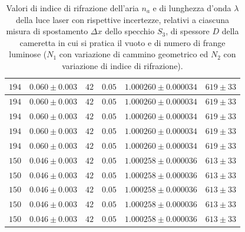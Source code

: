 \documentclass[]{article}
\begin{document}
\begin{table}[H]
\begin{tabular}{||c|c||c|c||c|c||}
        \hline
        $194$ & $0.060 \pm 0.003$ & $42$ & $0.05$ & $1.000260 \pm 0.000034$ & $619 \pm 33$ \\\hline
        $194$ & $0.060 \pm 0.003$ & $42$ & $0.05$ & $1.000260 \pm 0.000034$ & $619 \pm 33$ \\\hline
        $194$ & $0.060 \pm 0.003$ & $42$ & $0.05$ & $1.000260 \pm 0.000034$ & $619 \pm 33$ \\\hline
        $194$ & $0.060 \pm 0.003$ & $42$ & $0.05$ & $1.000260 \pm 0.000034$ & $619 \pm 33$ \\\hline
        $194$ & $0.060 \pm 0.003$ & $42$ & $0.05$ & $1.000260 \pm 0.000034$ & $619 \pm 33$ \\\hline
        \hline
        $150$ & $0.046 \pm 0.003$ & $42$ & $0.05$ & $1.000258 \pm 0.000036$ & $613 \pm 33$ \\\hline
        $150$ & $0.046 \pm 0.003$ & $42$ & $0.05$ & $1.000258 \pm 0.000036$ & $613 \pm 33$ \\\hline
        $150$ & $0.046 \pm 0.003$ & $42$ & $0.05$ & $1.000258 \pm 0.000036$ & $613 \pm 33$ \\\hline
        $150$ & $0.046 \pm 0.003$ & $42$ & $0.05$ & $1.000258 \pm 0.000036$ & $613 \pm 33$ \\\hline
        $150$ & $0.046 \pm 0.003$ & $42$ & $0.05$ & $1.000258 \pm 0.000036$ & $613 \pm 33$ \\\hline
        
    \end{tabular}
    \caption{Valori di indice di rifrazione dell'aria $n_a$ e di lunghezza d'onda $\lambda$ della luce laser con rispettive incertezze, relativi a ciascuna misura di spostamento $\Delta x$ dello specchio $S_3$, di spessore $D$ della cameretta in cui si pratica il vuoto e di numero di frange luminose ($N_1$ con variazione di cammino geometrico ed $N_2$ con variazione di indice di rifrazione).}
    \label{tab:n_a}
\end{table}
\end{document}
